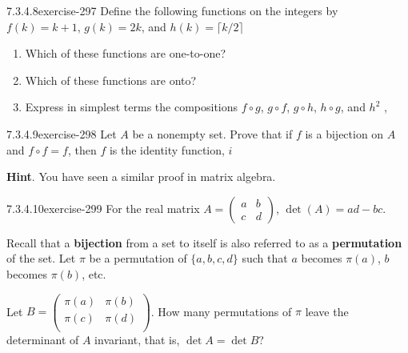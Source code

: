 \documentclass[twoside,10pt,]{book}
\newcommand{\terminology}[1]{\textbf{#1}}
\numberwithin{equation}{section}
\begin{document}
\begin{divisionsolution}{7.3.4.8}{}{exercise-297}%
\hypertarget{p-2496}{}%
Define the following functions on the integers by \(f(k) = k + 1\), \(g(k) = 2k\), and \(h(k)=\lceil k/2\rceil\)%
\par
\hypertarget{p-2497}{}%
\leavevmode%
\begin{enumerate}[label=(\alph*)]
\item\hypertarget{li-1270}{}\hypertarget{p-2498}{}%
Which of these functions are one-to-one?%
\item\hypertarget{li-1271}{}\hypertarget{p-2499}{}%
Which of these functions are onto?%
\item\hypertarget{li-1272}{}\hypertarget{p-2500}{}%
Express in simplest terms the compositions \(f\circ g\), \(g \circ f\), \(g \circ  h\), \(h \circ  g\), and \(h^2\) ,%
\end{enumerate}
%
\end{divisionsolution}%
\begin{divisionsolution}{7.3.4.9}{}{exercise-298}%
\hypertarget{p-2501}{}%
Let \(A\) be a nonempty set. Prove that if \(f \) is a bijection on \(A\) and \(f \circ f=f\), then \(f\) is the identity function, \(i\)%
\par\smallskip%
\noindent\textbf{Hint}.\quad%
\hypertarget{p-2502}{}%
You have seen a similar proof in matrix algebra.%
\end{divisionsolution}%
\begin{divisionsolution}{7.3.4.10}{}{exercise-299}%
\hypertarget{p-2503}{}%
For the real matrix \(A=\left(
\begin{array}{cc}
a & b \\
c & d 
\end{array}
\right)\), \(\det(A)= a d-b c\).%
\par
\hypertarget{p-2504}{}%
Recall that a  \terminology{bijection} from a set to itself is also referred to as a \terminology{permutation} of the set. Let \(\pi\) be a permutation of \(\{a,b,c,d\}\) such that \(a\) becomes \(\pi (a)\), \(b\) becomes \(\pi (b)\), etc.%
\par
\hypertarget{p-2505}{}%
Let \(B=\left(
\begin{array}{cc}
\pi(a)& \pi(b)\\
\pi(c)& \pi(d)\\
\end{array}
\right)\). How many permutations of \(\pi\) leave the determinant of \(A\) invariant, that is, \(\det  A = \det  B\)?%
\end{divisionsolution}%
\end{document}
